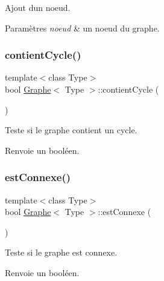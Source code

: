 Ajout d\textquotesingle{}un noeud. 


\begin{DoxyParams}{Paramètres}
{\em noeud} & un noeud du graphe. \\
\hline
\end{DoxyParams}
\mbox{\label{class_graphe_aa003e00ed2d8c1d49c4b80e3dabfa4fd}} 
\subsubsection{\texorpdfstring{contient\+Cycle()}{contientCycle()}}
{\footnotesize\ttfamily template$<$class Type$>$ \\
bool \hyperlink{class_graphe}{Graphe}$<$ Type $>$\+::contient\+Cycle (\begin{DoxyParamCaption}{ }\end{DoxyParamCaption})}



Teste si le graphe contient un cycle. 

\begin{DoxyReturn}{Renvoie}
un booléen. 
\end{DoxyReturn}
\mbox{\label{class_graphe_a15609b3cd6e0ab6a96afb579ffd420c4}} 
\subsubsection{\texorpdfstring{est\+Connexe()}{estConnexe()}}
{\footnotesize\ttfamily template$<$class Type$>$ \\
bool \hyperlink{class_graphe}{Graphe}$<$ Type $>$\+::est\+Connexe (\begin{DoxyParamCaption}{ }\end{DoxyParamCaption})}



Teste si le graphe est connexe. 

\begin{DoxyReturn}{Renvoie}
un booléen. 
\end{DoxyReturn}
\mbox{\label{class_graphe_a4d2b2b022f6c4747f15e1f4e059fef33}} 
